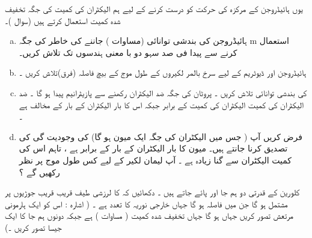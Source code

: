  یوں ہائیڈروجن کے مرکزہ کی حرکت کو درست کرنے کے لیے ہم الیکٹران  کی کمیت کی جگہ تخفیف شدہ کمیت استعمال کرتے ہیں  (سوال )۔ 
\begin{enumerate}[a.]
\item
 ہائیڈروجن کی بندشی  توانائی (مساوات ) جاننے کی خاطر   کی جگہ m استعمال کرنے سے پیدا فی صد  سہو   دو با معنی ہندسوں تک   تلاش کریں۔  
\item
 ہائیڈروجن اور ڈیوٹریم کے لیے   سرخ بالمر لکیروں      کے طول موج کے بیچ    فاصلہ  (فرق)تلاش کریں ۔ 
\item
  کی بندشی توانائی تلاش کریں ۔ پروٹان کی جگہ  ضد الیکٹران رکھنے سے پازیٹرانیم پیدا ہو گا ۔ ضد الیکٹران کی کمیت الیکٹران کی کمیت کے برابر   جبکہ اس کا بار  الیکٹران کے بار  کے مخالف ہے ۔ 
\item
 فرض کریں آپ   (    جس میں الیکٹران کی جگہ ایک میون  ہو گا) کی وجودیت گی کی تصدیق کرنا جانتے ہیں۔ میون کا بار  الیکٹران کے بار  کے برابر ہے ، تاہم  اس کی کمیت  الیکٹران سے گنا زیادہ   ہے ۔  آپ لیمان    لکیر    کے لیے کس طول  موج پر نظر رکھیں گے ؟
\end{enumerate}
کلورین کے قدرتی دو ہم جا    اور    پائے جاتے ہیں ۔ دکھائیں کہ   کا   لرزشی   طیف قریب قریب   جوڑیوں پر مشتمل ہو گا   جن میں فاصلہ    ہو گا جہاں  خارجی نوریہ کا تعدد ہے ۔  ( اشارہ : اس کو ایک ہارمونی مرتعش تصور کریں جہاں   ہو گا   جہاں   تخفیف شدہ کمیت ( مساوات   ) ہے   جبکہ  دونوں ہم جا  کا    ایک   جیسا تصور کریں ۔) 


